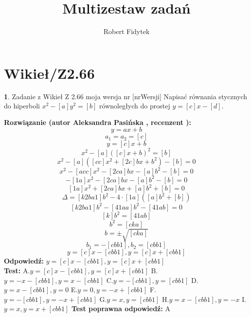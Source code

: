\documentclass[12pt, a4paper]{article}
\title{Multizestaw zadań}
\author{Robert Fidytek}
\date{}
\theoremstyle{definition} %
\newtheorem{zad}{}
\newcommand{\kategoria}[1]{\section{#1}} %
\newcommand{\zadStart}[1]{\begin{zad}#1\newline} %
\newcommand{\zadStop}{\end{zad}}   %
\newcommand{\rozwStart}[2]{\noindent \textbf{Rozwiązanie (autor #1 , recenzent #2): }\newline} %
\newcommand{\rozwStop}{\newline}                                            %
\newcommand{\odpStart}{\noindent \textbf{Odpowiedź:}\newline}    %
\newcommand{\odpStop}{\newline}                                             %
\newcommand{\testStart}{\noindent \textbf{Test:}\newline} %
\newcommand{\testStop}{\newline} %
\newcommand{\kluczStart}{\noindent \textbf{Test poprawna odpowiedź:}\newline} %
\newcommand{\kluczStop}{\newline} %
\begin{document}
\maketitle


\kategoria{Wikieł/Z2.66}
\zadStart{Zadanie z Wikieł Z 2.66 moja wersja nr [nrWersji]}
Napisać równania stycznych do hiperboli $x^2-[a]y^2=[b]$ równoległych do prostej $y=[c]x-[d]$.
\zadStop
\rozwStart{Aleksandra Pasińska}{}
$$y=ax+b$$
$$a_1=a_2=[c]$$
$$y=[c]x+b$$
$$x^2-[a]([c]x+b)^2=[b]$$
$$x^2-[a]([cc]x^2+[2c]bx+b^2)-[b]=0$$
$$x^2-[acc]x^2-[2ca]bx-[a]b^2-[b]=0$$
$$-[1a]x^2-[2ca]bx-[a]b^2-[b]=0$$
$$[1a]x^2+[2ca]bx+[a]b^2+[b]=0$$
$$\Delta=[k2ba1]b^2-4\cdot[1a]([a]b^2+[b])$$
$$[k2ba1]b^2-[41aa]b^2-[41ab]=0$$
$$[k]b^2=[41ab]$$
$$b^2=[cka]$$
$$b=\pm \sqrt{[cka]}$$
$$b_1=-[cbb1],b_2=[cbb1]$$
$$ y=[c]x-[cbb1], y=[c]x+[cbb1]$$
\rozwStop
\odpStart
$ y=[c]x-[cbb1], y=[c]x+[cbb1]$\\
\odpStop
\testStart
A.$ y=[c]x-[cbb1], y=[c]x+[cbb1]$
B.$ y=-x-[cbb1], y=x-[cbb1]$
C.$ y=-[cbb1], y=[cbb1]$
D.$ y=x-[cbb1], y=0$
E.$ y=0, y=-x+[cbb1]$
F.$ y=-[cbb1], y=-x+[cbb1]$
G.$ y=x, y=[cbb1]$
H.$ y=x-[cbb1], y=-x$
I.$ y=x, y=x+[cbb1]$
\testStop
\kluczStart
A
\kluczStop
\end{document}
